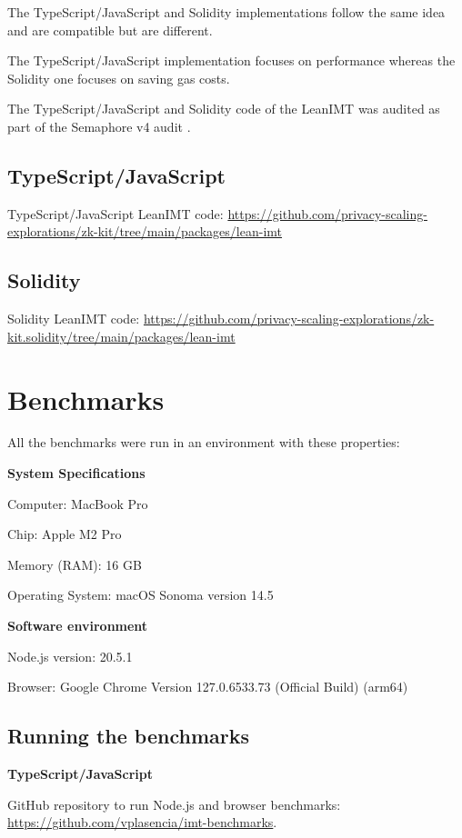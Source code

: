 \documentclass{article}
\begin{document}
The TypeScript/JavaScript and Solidity implementations follow the same idea and are compatible but are different.

The TypeScript/JavaScript implementation focuses on performance whereas the Solidity one focuses on saving gas costs.

The TypeScript/JavaScript and Solidity code of the LeanIMT was audited as part of the Semaphore v4 audit \cite{semaphore_v4_audit_report}.

\subsection{TypeScript/JavaScript}

TypeScript/JavaScript LeanIMT code: \url{https://github.com/privacy-scaling-explorations/zk-kit/tree/main/packages/lean-imt}

\subsection{Solidity}

Solidity LeanIMT code: \url{https://github.com/privacy-scaling-explorations/zk-kit.solidity/tree/main/packages/lean-imt}


\section{Benchmarks}

All the benchmarks were run in an environment with these properties:

\textbf{System Specifications}

Computer: MacBook Pro

Chip: Apple M2 Pro

Memory (RAM): 16 GB

Operating System: macOS Sonoma version 14.5

\textbf{Software environment}

Node.js version: 20.5.1

Browser: Google Chrome Version 127.0.6533.73 (Official Build) (arm64)

\subsection{Running the benchmarks}

\textbf{TypeScript/JavaScript}

GitHub repository to run Node.js and browser benchmarks: \url{https://github.com/vplasencia/imt-benchmarks}.
\end{document}
